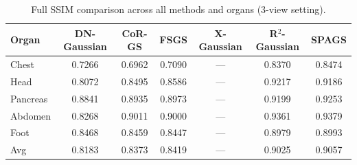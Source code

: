 \begin{table}[t]
\centering
\caption{Full SSIM comparison across all methods and organs (3-view setting).}
\label{tab:ssim_full}
\begin{tabular}{lcccccc}
\toprule
Organ & DN-Gaussian & CoR-GS & FSGS & X-Gaussian & R$^2$-Gaussian & SPAGS \\
\midrule
Chest & 0.7266 & 0.6962 & 0.7090 & --- & 0.8370 & 0.8474 \\
Head & 0.8072 & 0.8495 & 0.8586 & --- & 0.9217 & 0.9186 \\
Pancreas & 0.8841 & 0.8935 & 0.8973 & --- & 0.9199 & 0.9253 \\
Abdomen & 0.8268 & 0.9011 & 0.9000 & --- & 0.9361 & 0.9379 \\
Foot & 0.8468 & 0.8459 & 0.8447 & --- & 0.8979 & 0.8993 \\
\midrule
Avg & 0.8183 & 0.8373 & 0.8419 & --- & 0.9025 & 0.9057 \\
\bottomrule
\end{tabular}
\end{table}
